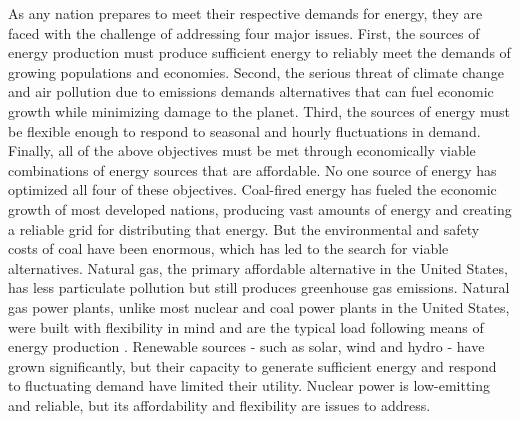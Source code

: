 As any nation prepares to meet their respective demands for energy, they are faced with the challenge of addressing four major issues. First, the sources of energy production must produce sufficient energy to reliably meet the demands of growing populations and economies. Second, the serious threat of climate change and air pollution due to emissions demands alternatives that can fuel economic growth while minimizing damage to the planet. Third, the sources of energy must be flexible enough to respond to seasonal and hourly fluctuations in demand. Finally, all of the above objectives must be met through economically viable combinations of energy sources that are affordable.
No one source of energy has optimized all four of these objectives. Coal-fired energy has fueled the economic growth of most developed nations, producing vast amounts of energy and creating a reliable grid for distributing that energy. But the environmental and safety costs of coal have been enormous, which has led to the search for viable alternatives. Natural gas, the primary affordable alternative in the United States, has less particulate pollution but still produces greenhouse gas emissions. Natural gas power plants, unlike most nuclear and coal power plants in the United States, were built with flexibility in mind and are the typical load following means of energy production \cite{MITEnergyInitiative2011}. Renewable sources - such as solar, wind and hydro - have grown significantly, but their capacity to generate sufficient energy and respond to fluctuating demand have limited their utility. Nuclear power is low-emitting and reliable, but its affordability and flexibility are issues to address.

